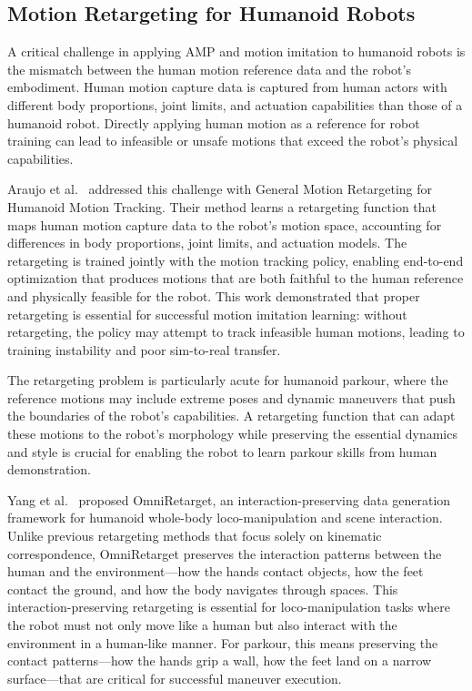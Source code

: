 \subsection{Motion Retargeting for Humanoid Robots}

A critical challenge in applying AMP and motion imitation to humanoid robots is the mismatch between the human motion reference data and the robot's embodiment. Human motion capture data is captured from human actors with different body proportions, joint limits, and actuation capabilities than those of a humanoid robot. Directly applying human motion as a reference for robot training can lead to infeasible or unsafe motions that exceed the robot's physical capabilities.

Araujo et al.~\cite{araujo2024retargeting} addressed this challenge with General Motion Retargeting for Humanoid Motion Tracking. Their method learns a retargeting function that maps human motion capture data to the robot's motion space, accounting for differences in body proportions, joint limits, and actuation models. The retargeting is trained jointly with the motion tracking policy, enabling end-to-end optimization that produces motions that are both faithful to the human reference and physically feasible for the robot. This work demonstrated that proper retargeting is essential for successful motion imitation learning: without retargeting, the policy may attempt to track infeasible human motions, leading to training instability and poor sim-to-real transfer.

The retargeting problem is particularly acute for humanoid parkour, where the reference motions may include extreme poses and dynamic maneuvers that push the boundaries of the robot's capabilities. A retargeting function that can adapt these motions to the robot's morphology while preserving the essential dynamics and style is crucial for enabling the robot to learn parkour skills from human demonstration.

Yang et al.~\cite{yang2024omniretarget} proposed OmniRetarget, an interaction-preserving data generation framework for humanoid whole-body loco-manipulation and scene interaction. Unlike previous retargeting methods that focus solely on kinematic correspondence, OmniRetarget preserves the interaction patterns between the human and the environment---how the hands contact objects, how the feet contact the ground, and how the body navigates through spaces. This interaction-preserving retargeting is essential for loco-manipulation tasks where the robot must not only move like a human but also interact with the environment in a human-like manner. For parkour, this means preserving the contact patterns---how the hands grip a wall, how the feet land on a narrow surface---that are critical for successful maneuver execution.

